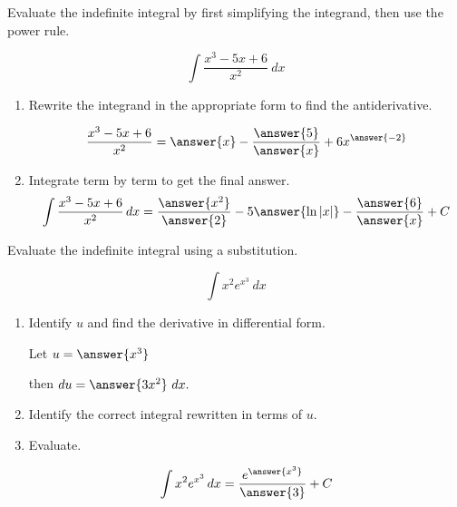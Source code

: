 \documentclass{ximera}
\begin{document}
\begin{problem}
Evaluate the indefinite integral by first simplifying the integrand, then use the power rule.

\[
\int \frac{x^3 - 5x + 6}{x^2} \ dx
\]

\begin{enumerate}
\item Rewrite the integrand in the appropriate form to find the antiderivative. 

\[
\frac{x^3 - 5x + 6}{x^2} = \answer{x} - \frac{\answer{5}}{\answer{x}} + 6 x^{\answer{-2}}
\]

\item Integrate term by term to get the final answer. 
\[
\int \frac{x^3 - 5x + 6}{x^2} \, dx = \frac{\answer{x^2}}{\answer{2}} - 5 \answer{\ln|x|} - \frac{\answer{6}}{\answer{x}} + C
\]

\end{enumerate}
\end{problem}


\begin{problem}
Evaluate the indefinite integral using a substitution. 


\[
\int x^2 e^{x^3} \ dx
\]


\begin{enumerate}
\item Identify $u$ and find the derivative in differential form.

Let $u = \answer{x^3}$

then $du = \answer{3x^2} \ dx.$

\item Identify the correct integral rewritten in terms of $u.$

\begin{multipleChoice}
\end{multipleChoice}


\item Evaluate.

\[
\int x^2 e^{x^3} \, dx = \frac{ e^{\answer{x^3}} }{ \answer{3} } + C
\]

\end{enumerate}
\end{problem}
\end{document}
